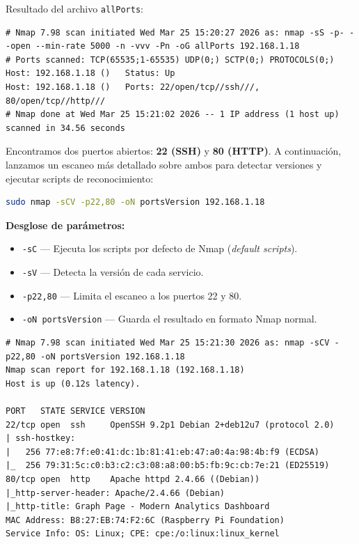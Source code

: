 \documentclass[12pt,a4paper]{article}
\newcommand{\cmd}[1]{%
  \colorbox{inlinebg}{\texttt{\small\color{wlcyan}#1}}%
}
\begin{document}
Resultado del archivo \texttt{allPorts}:

\begin{lstlisting}[style=output]
# Nmap 7.98 scan initiated Wed Mar 25 15:20:27 2026 as: nmap -sS -p- --open --min-rate 5000 -n -vvv -Pn -oG allPorts 192.168.1.18
# Ports scanned: TCP(65535;1-65535) UDP(0;) SCTP(0;) PROTOCOLS(0;)
Host: 192.168.1.18 ()   Status: Up
Host: 192.168.1.18 ()   Ports: 22/open/tcp//ssh///, 80/open/tcp//http///
# Nmap done at Wed Mar 25 15:21:02 2026 -- 1 IP address (1 host up) scanned in 34.56 seconds
\end{lstlisting}

Encontramos dos puertos abiertos: \textbf{22 (SSH)} y \textbf{80 (HTTP)}. A continuación, lanzamos un escaneo más detallado sobre ambos para detectar versiones y ejecutar scripts de reconocimiento:

\begin{lstlisting}[language=bash]
sudo nmap -sCV -p22,80 -oN portsVersion 192.168.1.18
\end{lstlisting}

\begin{notebox}
  \textbf{Desglose de parámetros:}
  \begin{itemize}
    \item \cmd{-sC} — Ejecuta los scripts por defecto de Nmap (\textit{default scripts}).
    \item \cmd{-sV} — Detecta la versión de cada servicio.
    \item \cmd{-p22,80} — Limita el escaneo a los puertos 22 y 80.
    \item \cmd{-oN portsVersion} — Guarda el resultado en formato Nmap normal.
  \end{itemize}
\end{notebox}

\begin{lstlisting}[style=output]
# Nmap 7.98 scan initiated Wed Mar 25 15:21:30 2026 as: nmap -sCV -p22,80 -oN portsVersion 192.168.1.18
Nmap scan report for 192.168.1.18 (192.168.1.18)
Host is up (0.12s latency).

PORT   STATE SERVICE VERSION
22/tcp open  ssh     OpenSSH 9.2p1 Debian 2+deb12u7 (protocol 2.0)
| ssh-hostkey:
|   256 77:e8:7f:e0:41:dc:1b:81:41:eb:47:a0:4a:98:4b:f9 (ECDSA)
|_  256 79:31:5c:c0:b3:c2:c3:08:a8:00:b5:fb:9c:cb:7e:21 (ED25519)
80/tcp open  http    Apache httpd 2.4.66 ((Debian))
|_http-server-header: Apache/2.4.66 (Debian)
|_http-title: Graph Page - Modern Analytics Dashboard
MAC Address: B8:27:EB:74:F2:6C (Raspberry Pi Foundation)
Service Info: OS: Linux; CPE: cpe:/o:linux:linux_kernel
\end{lstlisting}
\end{document}
